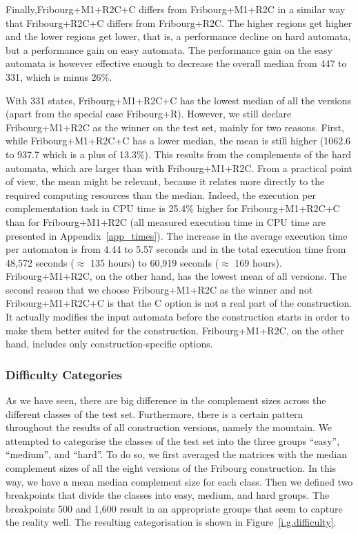 Finally,Fribourg+M1+R2C+C differs from Fribourg+M1+R2C in a similar way that Fribourg+R2C+C differs from Fribourg+R2C. The higher regions get higher and the lower regions get lower, that is, a performance decline on hard automata, but a performance gain on easy automata. The performance gain on the easy automata is however effective enough to decrease the overall median from 447 to 331, which is minus 26\%.

With 331 states, Fribourg+M1+R2C+C has the lowest median of all the versions (apart from the special case Fribourg+R). However, we still declare Fribourg+M1+R2C as the winner on the \goal{} test set, mainly for two reasons. First, while Fribourg+M1+R2C+C has a lower median, the mean is still higher (1062.6 to 937.7 which is a plus of 13.3\%). This results from the complements of the hard automata, which are larger than with Fribourg+M1+R2C. From a practical point of view, the mean might be relevant, because it relates more directly to the required computing resources than the median. Indeed, the execution per complementation task in CPU time is 25.4\% higher for Fribourg+M1+R2C+C than for Fribourg+M1+R2C (all measured execution time in CPU time are presented in Appendix~\ref{app_times}). The increase in the average execution time per automaton is from 4.44 to 5.57 seconds and in the total execution time from 48,572 seconds ($\approx$ 135 hours) to 60,919 seconds ($\approx$ 169 hours). Fribourg+M1+R2C, on the other hand, has the lowest mean of all versions. The second reason that we choose Fribourg+M1+R2C as the winner and not Fribourg+M1+R2C+C is that the C option is not a real part of the construction. It actually modifies the input automata before the construction starts in order to make them better suited for the construction. Fribourg+M1+R2C, on the other hand, includes only construction-specific options.

\subsubsection{Difficulty Categories}
As we have seen, there are big difference in the complement sizes across the different classes of the \goal{} test set. Furthermore, there is a certain pattern throughout the results of all construction versions, namely the mountain. We attempted to categorise the classes of the \goal{} test set into the three groups ``easy'', ``medium'', and ``hard''. To do so, we first averaged the matrices with the median complement sizes of all the eight versions of the Fribourg construction. In this way, we have a mean median complement size for each class. Then we defined two breakpoints that divide the classes into easy, medium, and hard groups. The breakpoints 500 and 1,600 result in an appropriate groups that seem to capture the reality well. The resulting categorisation is shown in Figure~\ref{i.g.difficulty}.

